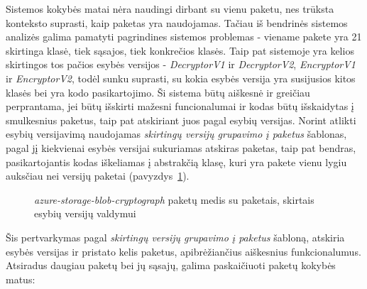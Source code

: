 Sistemos kokybės matai nėra naudingi dirbant su vienu paketu, nes trūksta konteksto suprasti, kaip paketas yra naudojamas.
Tačiau iš bendrinės sistemos analizės galima pamatyti pagrindines sistemos problemas - viename pakete yra 21 skirtinga klasė, tiek sąsajos, tiek konkrečios klasės.
Taip pat sistemoje yra kelios skirtingos tos pačios esybės versijos - \textit{DecryptorV1} ir \textit{DecryptorV2}, \textit{EncryptorV1} ir \textit{EncryptorV2}, todėl sunku
suprasti, su kokia esybės versija yra susijusios kitos klasės bei yra kodo pasikartojimo.
Ši sistema būtų aiškesnė ir greičiau perprantama, jei būtų išskirti mažesni funcionalumai ir kodas būtų išskaidytas į smulkesnius paketus, taip pat atskiriant juos
pagal esybių versijas.
Norint atlikti esybių versijavimą naudojamas \textit{skirtingų versijų grupavimo į paketus} šablonas, pagal jį kiekvienai esybės versijai sukuriamas atskiras paketas,
taip pat bendras, pasikartojantis kodas iškeliamas į abstrakčią klasę, kuri yra pakete vienu lygiu auksčiau nei versijų paketai (pavyzdys~\ref{fig:rep}).
\begin{figure}[H]
    \snugshade
    \endsnugshade
    \caption{\textit{azure-storage-blob-cryptograph} paketų medis su paketais, skirtais esybių versijų valdymui}
    \label{fig:rep}
\end{figure}
Šis pertvarkymas pagal \textit{skirtingų versijų grupavimo į paketus} šabloną, atskiria esybės versijas ir pristato kelis paketus, apibrėžiančius aiškesnius funkcionalumus.
Atsiradus daugiau paketų bei jų sąsajų, galima paskaičiuoti paketų kokybės matus:
